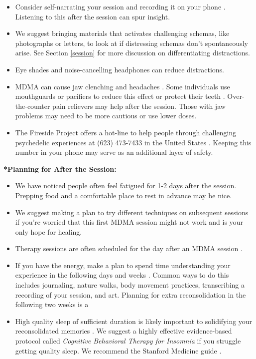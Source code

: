\documentclass[12pt,letterpaper]{article}
\begin{document}
\begin{itemize}
    \item Consider self-narrating your session and recording it on your phone \cite{mithoeferManual}. Listening to this after the session can spur insight.
    \item We suggest bringing materials that activates challenging schemas, like photographs or letters, to look at if distressing schemas don't spontaneously arise. See Section \ref{session} for more discussion on differentiating distractions.
    \item Eye shades and noise-cancelling headphones can reduce distractions.
    \item MDMA can cause jaw clenching and headaches \cite{mitchellMDMAClinicalTrial2,liechtiGender}. Some individuals use mouthguards or pacifiers to reduce this effect or protect their teeth \cite{emdeEmergency}. Over-the-counter pain relievers may help after the session. Those with jaw problems may need to be more cautious or use lower doses. 
    \item The Fireside Project offers a hot-line to help people through challenging psychedelic experiences at (623) 473-7433 in the United States \cite{firesideProject}. Keeping this number in your phone may serve as an additional layer of safety.
\end{itemize}
\noindent \textbf{*Planning for After the Session:}
\begin{itemize}
    \item We have noticed people often feel fatigued for 1-2 days after the session. Prepping food and a comfortable place to rest in advance may be nice.
    \item We suggest making a plan to try different techniques on subsequent sessions if you're worried that this first MDMA session might not work and is your only hope for healing.
    \item Therapy sessions are often scheduled for the day after an MDMA session \cite{mithoeferManual}. 
    \item If you have the energy, make a plan to spend time understanding your experience in the following days and weeks \cite{mithoeferManual}. Common ways to do this includes journaling, nature walks, body movement practices, transcribing a recording of your session, and art. Planning for extra reconsolidation in the following two weeks is a
    \item High quality sleep of sufficient duration is likely important to solidifying your reconsolidated memories \cite{simon2020sleep}. We suggest a highly effective evidence-based protocol called \textit{Cognitive Behavioral Therapy for Insomnia} if you struggle getting quality sleep. We recommend the Stanford Medicine guide \cite{stanfordSleep}.
\end{itemize}
\end{document}
